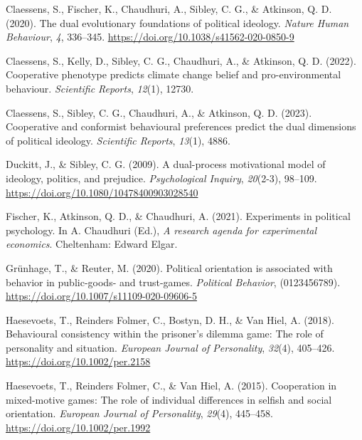 \documentclass[
  man,floatsintext]{apa6}
\newlength{\cslhangindent}
\newlength{\cslentryspacingunit} %
\newenvironment{CSLReferences}[2] %
 {%
  \setlength{\parindent}{0pt}
  \ifodd #1
  \let\oldpar\par
  \def\par{\hangindent=\cslhangindent\oldpar}
  \fi
  \setlength{\parskip}{#2\cslentryspacingunit}
 }%
 {}
\begin{document}
\begin{CSLReferences}{1}{0}
\leavevmode{}%
Claessens, S., Fischer, K., Chaudhuri, A., Sibley, C. G., \& Atkinson, Q. D. (2020). The dual evolutionary foundations of political ideology. \emph{Nature Human Behaviour}, \emph{4}, 336--345. \url{https://doi.org/10.1038/s41562-020-0850-9}

\leavevmode{}%
Claessens, S., Kelly, D., Sibley, C. G., Chaudhuri, A., \& Atkinson, Q. D. (2022). Cooperative phenotype predicts climate change belief and pro-environmental behaviour. \emph{Scientific Reports}, \emph{12}(1), 12730.

\leavevmode{}%
Claessens, S., Sibley, C. G., Chaudhuri, A., \& Atkinson, Q. D. (2023). Cooperative and conformist behavioural preferences predict the dual dimensions of political ideology. \emph{Scientific Reports}, \emph{13}(1), 4886.

\leavevmode{}%
Duckitt, J., \& Sibley, C. G. (2009). A dual-process motivational model of ideology, politics, and prejudice. \emph{Psychological Inquiry}, \emph{20}(2-3), 98--109. \url{https://doi.org/10.1080/10478400903028540}

\leavevmode{}%
Fischer, K., Atkinson, Q. D., \& Chaudhuri, A. (2021). Experiments in political psychology. In A. Chaudhuri (Ed.), \emph{A research agenda for experimental economics}. Cheltenham: Edward Elgar.

\leavevmode{}%
Grünhage, T., \& Reuter, M. (2020). Political orientation is associated with behavior in public-goods- and trust-games. \emph{Political Behavior}, (0123456789). \url{https://doi.org/10.1007/s11109-020-09606-5}

\leavevmode{}%
Haesevoets, T., Reinders Folmer, C., Bostyn, D. H., \& Van Hiel, A. (2018). Behavioural consistency within the prisoner's dilemma game: The role of personality and situation. \emph{European Journal of Personality}, \emph{32}(4), 405--426. \url{https://doi.org/10.1002/per.2158}

\leavevmode{}%
Haesevoets, T., Reinders Folmer, C., \& Van Hiel, A. (2015). Cooperation in mixed-motive games: The role of individual differences in selfish and social orientation. \emph{European Journal of Personality}, \emph{29}(4), 445--458. \url{https://doi.org/10.1002/per.1992}


\end{CSLReferences}
\end{document}
